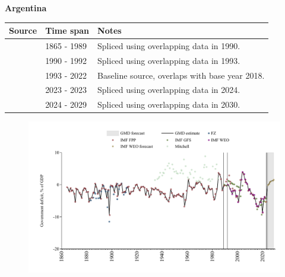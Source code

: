 \documentclass[12pt,a4paper,landscape]{article}
\begin{document}
\begin{adjustbox}{max totalsize={\paperwidth}{\paperheight},center}
\begin{minipage}[t][\textheight][t]{\textwidth}
\vspace*{0.5cm}
{}
\begin{center}
{\Large\bfseries Argentina}
\end{center}
\vspace{0.5cm}
\begin{table}[H]
\centering
\small
\begin{tabular}{|l|l|l|}
\hline
\textbf{Source} & \textbf{Time span} & \textbf{Notes} \\
\hline
\rowcolor{white}\cite{IMF_FPP}& 1865 - 1989 &Spliced using overlapping data in 1990.\\
\rowcolor{lightgray}\cite{IMF_GFS}& 1990 - 1992 &Spliced using overlapping data in 1993.\\
\rowcolor{white}\cite{IMF_WEO}& 1993 - 2022 &Baseline source, overlaps with base year 2018.\\
\rowcolor{lightgray}\cite{IMF_GFS}& 2023 - 2023 &Spliced using overlapping data in 2024.\\
\rowcolor{white}\cite{IMF_WEO_forecast}& 2024 - 2029 &Spliced using overlapping data in 2030.\\
\hline
\end{tabular}
\end{table}
\begin{figure}[H]
\centering
\includegraphics[width=\textwidth,height=0.6\textheight,keepaspectratio]{graphs/ARG_govdef_GDP.pdf}
\end{figure}
\end{minipage}
\end{adjustbox}
\end{document}
